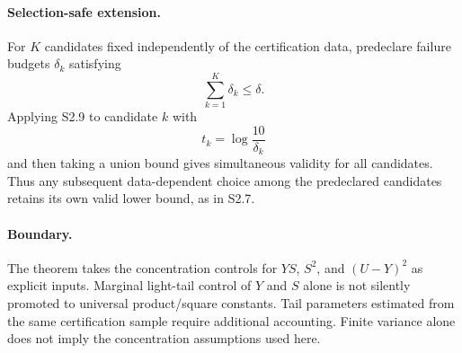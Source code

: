\paragraph{Selection-safe extension.}
For $K$ candidates fixed independently of the certification data, predeclare failure budgets $\delta_k$ satisfying
\[
\sum_{k=1}^K\delta_k\le\delta.
\]
Applying S2.9 to candidate $k$ with
\[
t_k=\log\frac{10}{\delta_k}
\]
and then taking a union bound gives simultaneous validity for all candidates. Thus any subsequent data-dependent choice among the predeclared candidates retains its own valid lower bound, as in S2.7.

\paragraph{Boundary.}
The theorem takes the concentration controls for $YS$, $S^2$, and $(U-Y)^2$ as explicit inputs. Marginal light-tail control of $Y$ and $S$ alone is not silently promoted to universal product/square constants. Tail parameters estimated from the same certification sample require additional accounting. Finite variance alone does not imply the concentration assumptions used here.
